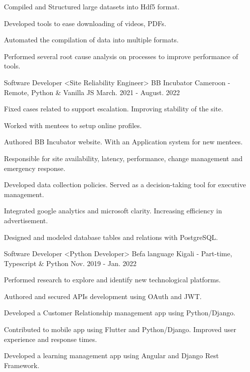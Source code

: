 \begin{cventries}
{\begin{cvitems}
        \item {Compiled and Structured large datasets into Hdf5 format.}
        \item {Developed tools to ease downloading of videos, PDFs.}
        \item {Automated the compilation of data into multiple formats.}
        \item {Performed several root cause analysis on processes to improve performance of tools.}
      \end{cvitems}
    }
  \cventry
    {Software Developer <Site Reliability Engineer>}
    {BB Incubator}
    {Cameroon - Remote, Python \& Vanilla JS}
    {March. 2021 - August. 2022}
    {
      \begin{cvitems}
        \item {Fixed cases related to support escalation. Improving stability of the site.}
        \item {Worked with mentees to setup online profiles.}
        \item {Authored BB Incubator website. With an Application system for new mentees.}
        \item {Responsible for site availability, latency, performance, change management and emergency response.}
        \item {Developed data collection policies. Served as a decision-taking tool for executive management.}
        \item {Integrated google analytics and microsoft clarity. Increasing efficiency in advertisement.}
        \item {Designed and modeled database tables and relations with PostgreSQL.}
      \end{cvitems}
    }
  \cventry
    {Software Developer <Python Developer>}
    {Befa language}
    {Kigali - Part-time, Typescript \& Python}
    {Nov. 2019 - Jan. 2022}
    {
      \begin{cvitems}
        \item {Performed research to explore and identify new technological platforms.}
        \item {Authored and secured APIs development using OAuth and JWT.}
        \item {Developed a Customer Relationship management app using  Python/Django.}
        \item {Contributed to mobile app using Flutter and Python/Django. Improved user experience and response times.}
        \item {Developed a learning management app using Angular and Django Rest Framework.}

\end{cvitems}}
\end{cventries}
